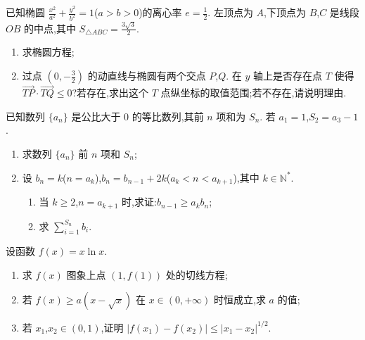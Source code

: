 \begin{problem}
已知椭圆 \(\frac{x^2}{a^2}+\frac{y^2}{b^2}=1\)(\(a>b>0\))的离心率 \(e=\frac12\). 左顶点为 \(A\),下顶点为 \(B\),\(C\) 是线段 \(OB\) 的中点,其中 \(S_{\triangle ABC}=\frac{3\sqrt3}{2}\).
\begin{enumerate}
    \item 求椭圆方程;
    \item 过点 \(\left(0,-\frac32\right)\) 的动直线与椭圆有两个交点 \(P\),\(Q\). 在 \(y\) 轴上是否存在点 \(T\) 使得 \(\overrightarrow{TP}\cdot \overrightarrow{TQ}\le 0\)?若存在,求出这个 \(T\) 点纵坐标的取值范围;若不存在,请说明理由.
\end{enumerate}
\end{problem}

\begin{problem}
已知数列 \(\{a_n\}\) 是公比大于 0 的等比数列,其前 \(n\) 项和为 \(S_n\). 若 \(a_1=1\),\(S_2=a_3-1\).
\begin{enumerate}
    \item 求数列 \(\{a_n\}\) 前 \(n\) 项和 \(S_n\);
    \item 设 \(b_n=k\)(\(n=a_k\)),\(b_n=b_{n-1}+2k\)(\(a_k<n<a_{k+1}\)),其中 \(k\in \mathbb N^*\).
    \begin{enumerate}
        \item 当 \(k\ge 2\),\(n=a_{k+1}\) 时,求证:\(b_{n-1}\ge a_k b_n\);
        \item 求 \(\displaystyle \sum_{i=1}^{S_n}b_i\).
    \end{enumerate}
\end{enumerate}
\end{problem}

\begin{problem}
设函数 \(f(x)=x\ln x\).
\begin{enumerate}
    \item 求 \(f(x)\) 图象上点 \((1,f(1))\) 处的切线方程;
    \item 若 \(f(x)\ge a(x-\sqrt{x})\) 在 \(x\in(0,+\infty)\) 时恒成立,求 \(a\) 的值;
    \item 若 \(x_1\),\(x_2\in(0,1)\),证明 \(|f(x_1)-f(x_2)|\le |x_1-x_2|^{1/2}\).
\end{enumerate}
\end{problem}

